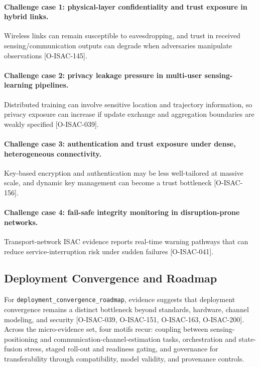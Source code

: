 \paragraph{Challenge case 1: physical-layer confidentiality and trust exposure in hybrid links.}
Wireless links can remain susceptible to eavesdropping, and trust in received sensing/communication outputs can degrade when adversaries manipulate observations [O-ISAC-145].

\paragraph{Challenge case 2: privacy leakage pressure in multi-user sensing-learning pipelines.}
Distributed training can involve sensitive location and trajectory information, so privacy exposure can increase if update exchange and aggregation boundaries are weakly specified [O-ISAC-039].

\paragraph{Challenge case 3: authentication and trust exposure under dense, heterogeneous connectivity.}
Key-based encryption and authentication may be less well-tailored at massive scale, and dynamic key management can become a trust bottleneck [O-ISAC-156].

\paragraph{Challenge case 4: fail-safe integrity monitoring in disruption-prone networks.}
Transport-network ISAC evidence reports real-time warning pathways that can reduce service-interruption risk under sudden failures [O-ISAC-041].

\subsection{Deployment Convergence and Roadmap}

For \texttt{deployment\_convergence\_roadmap}, evidence suggests that deployment convergence remains a distinct bottleneck beyond standards, hardware, channel modeling, and security [O-ISAC-039, O-ISAC-151, O-ISAC-163, O-ISAC-200]. Across the micro-evidence set, four motifs recur: coupling between sensing-positioning and communication-channel-estimation tasks, orchestration and state-fusion stress, staged roll-out and readiness gating, and governance for transferability through compatibility, model validity, and provenance controls.


